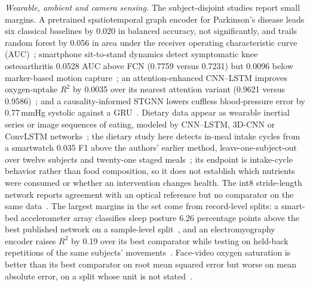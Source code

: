 \documentclass[journal]{IEEEtran}
\begin{document}
\emph{Wearable, ambient and camera sensing.} The subject-disjoint studies report small margins. A pretrained spatiotemporal graph encoder for Parkinson's disease leads six classical baselines by 0.020 in balanced accuracy, not significantly, and trails random forest by 0.056 in area under the receiver operating characteristic curve (AUC)~\cite{herath2026parkinson}; smartphone sit-to-stand dynamics detect symptomatic knee osteoarthritis 0.0528 AUC above FCN (0.7759 versus 0.7231) but 0.0096 below marker-based motion capture~\cite{chan2026sitstand}; an attention-enhanced CNN--LSTM improves oxygen-uptake $R^2$ by 0.0035 over its nearest attention variant (0.9621 versus 0.9586)~\cite{wang2025vo2}; and a causality-informed STGNN lowers cuffless blood-pressure error by 0.77\,mmHg systolic against a GRU~\cite{liu2024cignn}. Dietary data appear as wearable inertial series or image sequences of eating, modeled by CNN--LSTM, 3D-CNN or ConvLSTM networks~\cite{Rouast2020IntakeGesture}; the dietary study here detects in-meal intake cycles from a smartwatch 0.035 F1 above the authors' earlier method, leave-one-subject-out over twelve subjects and twenty-one staged meals~\cite{Kyritsis2019EatingBehavior}; its endpoint is intake-cycle behavior rather than food composition, so it does not establish which nutrients were consumed or whether an intervention changes health. The int8 stride-length network reports agreement with an optical reference but no comparator on the same data~\cite{verbiest2023gaitstride}. The largest margins in the set come from record-level splits: a smart-bed accelerometer array classifies sleep posture 6.26 percentage points above the best published network on a sample-level split~\cite{liu2025sleepposture}, and an electromyography encoder raises $R^2$ by 0.19 over its best comparator while testing on held-back repetitions of the same subjects' movements~\cite{lin2024smapen}. Face-video oxygen saturation is better than its best comparator on root mean squared error but worse on mean absolute error, on a split whose unit is not stated~\cite{zhu2024ippg}.
\end{document}
